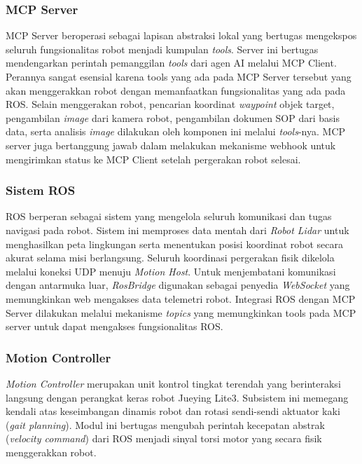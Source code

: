 \subsubsection{MCP Server}
MCP Server beroperasi sebagai lapisan abstraksi lokal yang bertugas mengekspos seluruh fungsionalitas robot menjadi kumpulan \textit{tools}. Server ini bertugas mendengarkan perintah pemanggilan \textit{tools} dari agen AI melalui MCP Client. Perannya sangat esensial karena tools yang ada pada MCP Server tersebut yang akan menggerakkan robot dengan memanfaatkan fungsionalitas yang ada pada ROS. Selain menggerakan robot, pencarian koordinat \textit{waypoint} objek target, pengambilan \textit{image} dari kamera robot, pengambilan dokumen SOP dari basis data, serta analisis \textit{image} dilakukan oleh komponen ini melalui \textit{tools}-nya. MCP server juga bertanggung jawab dalam melakukan mekanisme webhook untuk mengirimkan status ke MCP Client setelah pergerakan robot selesai.

\subsubsection{Sistem ROS}

ROS berperan sebagai sistem yang mengelola seluruh komunikasi dan tugas navigasi pada robot. Sistem ini memproses data mentah dari \textit{Robot Lidar} untuk menghasilkan peta lingkungan serta menentukan posisi koordinat robot secara akurat selama misi berlangsung. Seluruh koordinasi pergerakan fisik dikelola melalui koneksi UDP menuju \textit{Motion Host}. Untuk menjembatani komunikasi dengan antarmuka luar, \textit{RosBridge} digunakan sebagai penyedia \textit{WebSocket} yang memungkinkan web mengakses data telemetri robot. Integrasi ROS dengan MCP Server dilakukan melalui mekanisme \textit{topics} yang memungkinkan tools pada MCP server untuk dapat mengakses fungsionalitas ROS. 

\subsubsection{Motion Controller}
\textit{Motion Controller} merupakan unit kontrol tingkat terendah yang berinteraksi langsung dengan perangkat keras robot Jueying Lite3. Subsistem ini memegang kendali atas keseimbangan dinamis robot dan rotasi sendi-sendi aktuator kaki (\textit{gait planning}). Modul ini bertugas mengubah perintah kecepatan abstrak (\textit{velocity command}) dari ROS menjadi sinyal torsi motor yang secara fisik menggerakkan robot.


